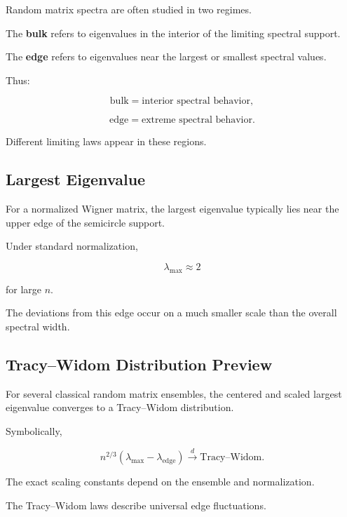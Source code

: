 Random matrix spectra are often studied in two regimes.

The \textbf{bulk} refers to eigenvalues in the interior of the limiting
spectral support.

The \textbf{edge} refers to eigenvalues near the largest or smallest
spectral values.

Thus:

\[
\boxed{
\text{bulk}
=
\text{interior spectral behavior},
}
\]

\[
\boxed{
\text{edge}
=
\text{extreme spectral behavior}.
}
\]

Different limiting laws appear in these regions.

\subsection{Largest Eigenvalue}
\label{subsec:largest-eigenvalue-rmt}

For a normalized Wigner matrix, the largest eigenvalue typically lies
near the upper edge of the semicircle support.

Under standard normalization,

\[
\boxed{
\lambda_{\max}
\approx
2
}
\]

for large \(n\).

The deviations from this edge occur on a much smaller scale than the
overall spectral width.

\subsection{Tracy--Widom Distribution Preview}
\label{subsec:tracy-widom-preview}

For several classical random matrix ensembles, the centered and scaled
largest eigenvalue converges to a Tracy--Widom distribution.

Symbolically,

\[
\boxed{
n^{2/3}
(
\lambda_{\max}-\lambda_{\mathrm{edge}}
)
\xrightarrow{d}
\text{Tracy--Widom}.
}
\]

The exact scaling constants depend on the ensemble and normalization.

The Tracy--Widom laws describe universal edge fluctuations.

